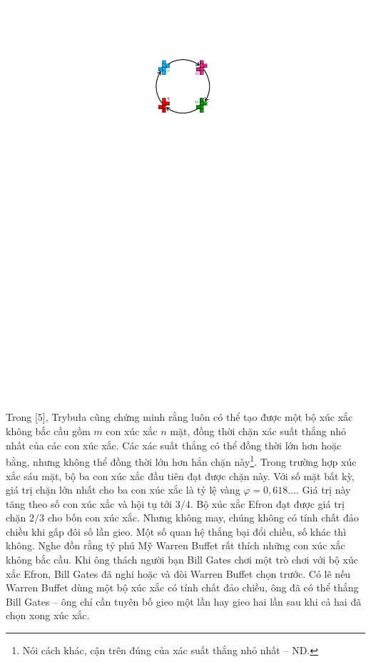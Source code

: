 \begin{multicols}{2}
\begin{figure}[H]
		\includegraphics[scale =0.8]{7}
		\vspace*{-10pt}
	\end{figure}
	Trong [$5$], Trybuła cũng chứng minh rằng luôn có thể tạo được một bộ xúc xắc không bắc cầu gồm $m$ con xúc xắc $n$ mặt, đồng thời chặn xác suất thắng nhỏ nhất của các con xúc xắc. Các xác suất thắng có thể đồng thời lớn hơn hoặc bằng, nhưng không thể đồng thời lớn hơn hẳn chặn này\footnote[3]{\color{quantoan}Nói cách khác, cận trên đúng của xác suất thắng nhỏ nhất -- ND.}.
	\vskip 0.05cm
	Trong trường hợp xúc xắc sáu mặt, bộ ba con xúc xắc đầu tiên đạt được chặn này. Với số mặt bất kỳ, giá trị chặn lớn nhất cho ba con xúc xắc là tỷ lệ vàng $\varphi = 0{,}618\dots$. Giá trị này tăng theo số con xúc xắc và hội tụ tới $3/4$.
	\vskip 0.05cm
	Bộ xúc xắc Efron đạt được giá trị chặn $2/3$ cho bốn con xúc xắc. Nhưng không may, chúng không có tính chất đảo chiều khi gấp đôi số lần gieo. Một số quan hệ thắng bại đổi chiều, số khác thì không.
	\vskip 0.05cm
	Nghe đồn rằng tỷ phú Mỹ Warren Buffet rất thích những con xúc xắc không bắc cầu. Khi ông thách người bạn Bill Gates chơi một trò chơi với bộ xúc xắc Efron, Bill Gates đã nghi hoặc và đòi Warren Buffet chọn trước. Có lẽ nếu Warren Buffet dùng một bộ xúc xắc có tính chất đảo chiều, ông đã có thể thắng Bill Gates -- ông chỉ cần tuyên bố gieo một lần hay gieo hai lần sau khi cả hai đã chọn xong xúc xắc.

\end{multicols}
